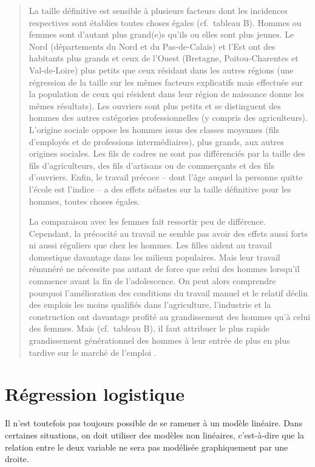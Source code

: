 \documentclass[
  french,
]{book}
\begin{document}
\begin{quote}
La taille définitive est sensible à plusieurs facteurs dont les incidences respectives sont établies toutes choses égales (cf.~tableau B). Hommes ou femmes sont d'autant plus grand(e)s qu'ils ou elles sont plus jeunes. Le Nord (départements du Nord et du Pas-de-Calais) et l'Est ont des habitants plus grands et ceux de l'Ouest (Bretagne, Poitou-Charentes et Val-de-Loire) plus petits que ceux résidant dans les autres régions (une régression de la taille sur les mêmes facteurs explicatifs mais effectuée sur la population de ceux qui résident dans leur région de naissance donne les mêmes résultats). Les ouvriers sont plus petits et se distinguent des hommes des autres catégories professionnelles (y compris des agriculteurs). L'origine sociale oppose les hommes issus des classes moyennes (fils d'employés et de professions intermédiaires), plus grands, aux autres origines sociales. Les fils de cadres ne sont pas différenciés par la taille des fils d'agriculteurs, des fils d'artisans ou de commerçants et des fils d'ouvriers. Enfin, le travail précoce -- dont l'âge auquel la personne quitte l'école est l'indice -- a des effets néfastes sur la taille définitive pour les hommes, toutes choses égales.

La comparaison avec les femmes fait ressortir peu de différence. Cependant, la précocité au travail ne semble pas avoir des effets aussi forts ni aussi réguliers que chez les hommes. Les filles aident au travail domestique davantage dans les milieux populaires. Mais leur travail rémunéré ne nécessite pas autant de force que celui des hommes lorsqu'il commence avant la fin de l'adolescence. On peut alors comprendre pourquoi l'amélioration des conditions du travail manuel et le relatif déclin des emplois les moins qualifiés dans l'agriculture, l'industrie et la construction ont davantage profité au grandissement des hommes qu'à celui des femmes. Mais (cf.~tableau B), il faut attribuer le plus rapide grandissement générationnel des hommes à leur entrée de plus en plus tardive sur le marché de l'emploi \citep[p.~74-75]{herpin2003}.
\end{quote}

\hypertarget{ruxe9gression-logistique}{%
\section{Régression logistique}\label{ruxe9gression-logistique}}

Il n'est toutefois pas toujours possible de se ramener à un modèle linéaire. Dans certaines situations, on doit utiliser des modèles non linéaires, c'est-à-dire que la relation entre le deux variable ne sera pas modélisée graphiquement par une droite.
\end{document}
